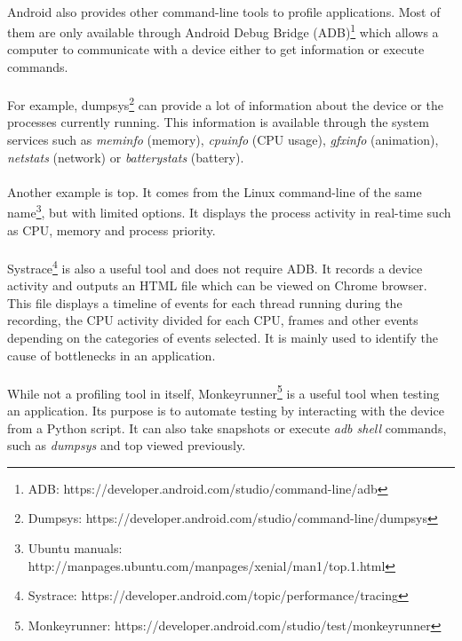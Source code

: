 \documentclass{kththesis}
\begin{document}
\paragraph{}
Android also provides other command-line tools to profile applications. Most of them are only available through Android Debug Bridge (ADB)\footnote{ADB: https://developer.android.com/studio/command-line/adb} which allows a computer to communicate with a device either to get information or execute commands. 

\paragraph{}
For example, dumpsys\footnote{Dumpsys: https://developer.android.com/studio/command-line/dumpsys} can provide a lot of information about the device or the processes currently running. This information is available through the system services such as \textit{meminfo} (memory), \textit{cpuinfo} (CPU usage), \textit{gfxinfo} (animation), \textit{netstats} (network) or \textit{batterystats} (battery).

\paragraph{}
Another example is top. It comes from the Linux command-line of the same name\footnote{Ubuntu manuals: http://manpages.ubuntu.com/manpages/xenial/man1/top.1.html}, but with limited options. It displays the process activity in real-time such as CPU, memory and process priority.

\paragraph{}
Systrace\footnote{Systrace: https://developer.android.com/topic/performance/tracing} is also a useful tool and does not require ADB. It records a device activity and outputs an HTML file which can be viewed on Chrome browser. This file displays a timeline of events for each thread running during the recording, the CPU activity divided for each CPU, frames and other events depending on the categories of events selected. It is mainly used to identify the cause of bottlenecks in an application.

\paragraph{}
While not a profiling tool in itself, Monkeyrunner\footnote{Monkeyrunner: https://developer.android.com/studio/test/monkeyrunner} is a useful tool when testing an application. Its purpose is to automate testing by interacting with the device from a Python script. It can also take snapshots or execute \textit{adb shell} commands, such as \textit{dumpsys} and top viewed previously. 
\end{document}
